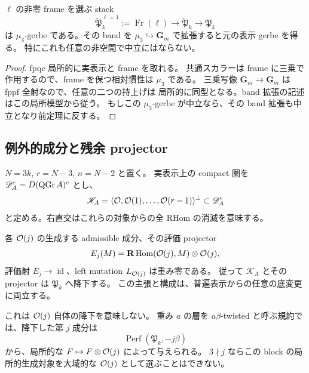 \begin{corollary}
\label{mbsd2:cor:relation-frame}
$\ell$ の非零 frame を選ぶ stack
\[
 \widetilde{\mathfrak P}_k^{\ell=1}
   :=\operatorname{Fr}(\ell)\longrightarrow\widetilde{\mathfrak P}_k
       \longrightarrow\mathfrak P_k
\]
は $\mu_3$-gerbe である。その band を
$\mu_3\hookrightarrow\mathbf G_m$ で拡張すると元の表示 gerbe を得る。
特にこれも任意の非空開で中立にはならない。
\end{corollary}
\begin{proof}
fpqc 局所的に実表示と frame を取れる。
共通スカラーは frame に三乗で作用するので、frame を保つ相対慣性は $\mu_3$ である。
三乗写像 $\mathbf G_m\to\mathbf G_m$ は fppf 全射なので、任意の二つの持上げは
局所的に同型となる。band 拡張の記述はこの局所模型から従う。
もしこの $\mu_3$-gerbe が中立なら、その band 拡張も中立となり前定理に反する。
\end{proof}

\subsection{例外的成分と残余 projector}

$N=3k$, $r=N-3$, $n=N-2$ と置く。
実表示上の compact 圏を $\mathscr D_A^c=D(\operatorname{QGr} A)^c$ とし、
\[
 \mathscr K_A=
 \langle\mathcal O,\mathcal O(1),\ldots,\mathcal O(r-1)\rangle^\perp
 \subset\mathscr D_A^c
\]
と定める。右直交はこれらの対象からの全 RHom の消滅を意味する。

\begin{theorem}
\label{mbsd2:thm:projector-descent}
各 $\mathcal O(j)$ の生成する admissible 成分、その評価 projector
\[
 E_j(M)=\mathbf R\operatorname{Hom}(\mathcal O(j),M)\otimes\mathcal O(j),
\]
評価射 $E_j\to\operatorname{id}$、left mutation $L_{\mathcal O(j)}$ は重み零である。
従って $\mathscr K_A$ とその projector は $\mathfrak P_k$ へ降下する。
この主張と構成は、普遍表示からの任意の底変更に両立する。

これは $\mathcal O(j)$ 自体の降下を意味しない。
重み $a$ の層を $a\beta$-twisted と呼ぶ規約では、降下した第 $j$ 成分は
\begin{equation}\label{mbsd2:eq:twisted-block}
 \operatorname{Perf}(\mathfrak P_k,-j\beta)
\end{equation}
から、局所的な $F\mapsto F\otimes\mathcal O(j)$ によって与えられる。
$3\nmid j$ ならこの block の局所的生成対象を大域的な $\mathcal O(j)$ として選ぶことはできない。
\end{theorem}

